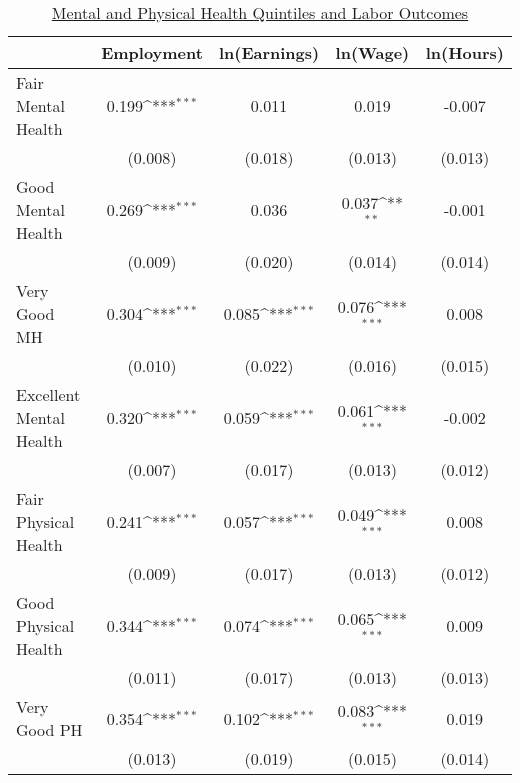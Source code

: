 \def\sym#1{\ifmmode^{#1}\else\(^{#1}\)\fi}
\begin{table}
\center\caption*{\large{\underline{Mental and Physical Health Quintiles  and Labor Outcomes}}}
\vspace{0.2cm}
\begin{tabular}{l*{4}{c}}
                    &\multicolumn{1}{c}{Employment}&\multicolumn{1}{c}{ln(Earnings)}&\multicolumn{1}{c}{ln(Wage)}&\multicolumn{1}{c}{ln(Hours)}\\
\midrule
Fair Mental Health  &       0.199\sym{***}&       0.011         &       0.019         &      -0.007         \\
                    &     (0.008)         &     (0.018)         &     (0.013)         &     (0.013)         \\
Good Mental Health  &       0.269\sym{***}&       0.036         &       0.037\sym{**} &      -0.001         \\
                    &     (0.009)         &     (0.020)         &     (0.014)         &     (0.014)         \\
Very Good MH        &       0.304\sym{***}&       0.085\sym{***}&       0.076\sym{***}&       0.008         \\
                    &     (0.010)         &     (0.022)         &     (0.016)         &     (0.015)         \\
Excellent Mental Health&       0.320\sym{***}&       0.059\sym{***}&       0.061\sym{***}&      -0.002         \\
                    &     (0.007)         &     (0.017)         &     (0.013)         &     (0.012)         \\
Fair Physical Health&       0.241\sym{***}&       0.057\sym{***}&       0.049\sym{***}&       0.008         \\
                    &     (0.009)         &     (0.017)         &     (0.013)         &     (0.012)         \\
Good Physical Health&       0.344\sym{***}&       0.074\sym{***}&       0.065\sym{***}&       0.009         \\
                    &     (0.011)         &     (0.017)         &     (0.013)         &     (0.013)         \\
Very Good PH        &       0.354\sym{***}&       0.102\sym{***}&       0.083\sym{***}&       0.019         \\
                    &     (0.013)         &     (0.019)         &     (0.015)         &     (0.014)         \\

\end{tabular}
\end{table}
